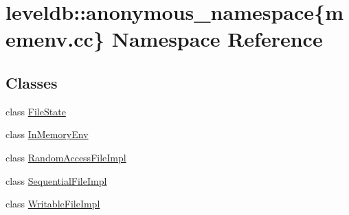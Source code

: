 \hypertarget{namespaceleveldb_1_1anonymous__namespace_02memenv_8cc_03}{}\section{leveldb\+:\+:anonymous\+\_\+namespace\{memenv.\+cc\} Namespace Reference}
\label{namespaceleveldb_1_1anonymous__namespace_02memenv_8cc_03}
\subsection*{Classes}
\begin{DoxyCompactItemize}
\item 
class \hyperlink{classleveldb_1_1anonymous__namespace_02memenv_8cc_03_1_1_file_state}{File\+State}
\item 
class \hyperlink{classleveldb_1_1anonymous__namespace_02memenv_8cc_03_1_1_in_memory_env}{In\+Memory\+Env}
\item 
class \hyperlink{classleveldb_1_1anonymous__namespace_02memenv_8cc_03_1_1_random_access_file_impl}{Random\+Access\+File\+Impl}
\item 
class \hyperlink{classleveldb_1_1anonymous__namespace_02memenv_8cc_03_1_1_sequential_file_impl}{Sequential\+File\+Impl}
\item 
class \hyperlink{classleveldb_1_1anonymous__namespace_02memenv_8cc_03_1_1_writable_file_impl}{Writable\+File\+Impl}
\end{DoxyCompactItemize}
